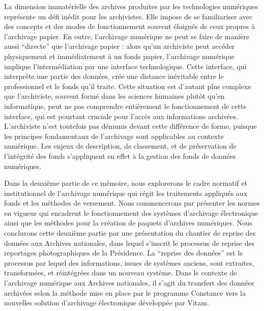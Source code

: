 La dimension immatérielle des archives produites par les technologies numériques représente un défi inédit pour les archivistes. Elle impose de se familiariser avec des concepts et des modes de fonctionnement souvent éloignés de ceux propres à l'archivage papier. En outre, l'archivage numérique ne peut se faire de manière aussi \enquote{directe} que l'archivage papier : alors qu'un archiviste peut accéder physiquement et immédiatement à un fonds papier, l'archivage numérique implique l'intermédiation par une interface technologique. Cette interface, qui interprète une partie des données, crée une distance inévitable entre le professionnel et le fonds qu'il traite. Cette situation est d'autant plus complexe que l'archiviste, souvent formé dans les sciences humaines plutôt qu'en informatique, peut ne pas comprendre entièrement le fonctionnement de cette interface, qui est pourtant cruciale pour l'accès aux informations archivées. L'archiviste n'est toutefois pas démunis devant cette différence de forme, puisque les principes fondamentaux de l'archivage sont applicables au contexte numérique. Les enjeux de description, de classement, et de préservation de l'intégrité des fonds s'appliquent en effet à la gestion des fonds de données numériques.

Dans la deuxième partie de ce mémoire, nous explorerons le cadre normatif et institutionnel de l'archivage numérique qui régit les traitements appliqués aux fonds et les méthodes de versement. Nous commencerons par présenter les normes en vigueur qui encadrent le fonctionnement des systèmes d'archivage électronique ainsi que les méthodes pour la création de paquets d'archives numériques. Nous conclurons cette deuxième partie par une présentation du chantier de reprise des données aux Archives nationales, dans lequel s'inscrit le processus de reprise des reportages photographiques de la Présidence. La \enquote{reprise des données} est le processus par lequel des informations, issues de systèmes anciens, sont extraites, transformées, et réintégrées dans un nouveau système. Dans le contexte de l'archivage numérique aux Archives nationales, il s'agit du transfert des données archivées selon la méthode mise en place par le programme Constance vers la nouvelles solution d'archivage électronique développée par Vitam. 

